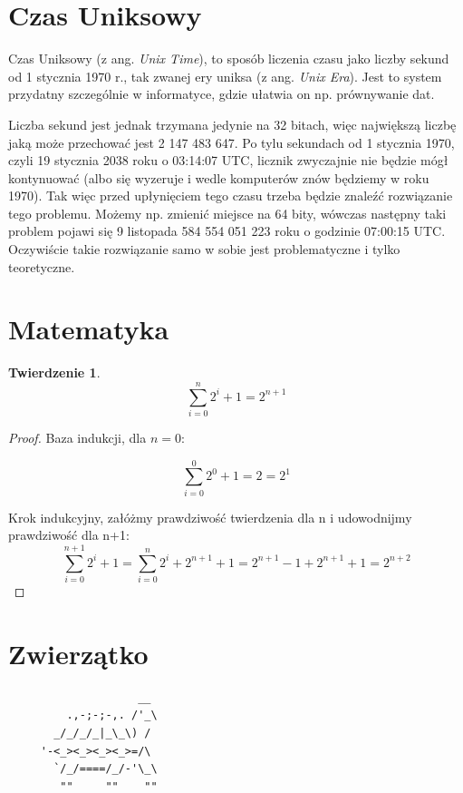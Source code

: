 \documentclass{article}
\newtheorem{twierdzenie}{Twierdzenie}
\begin{document}
\section{Czas Uniksowy}
Czas Uniksowy (z ang. \emph{Unix Time}), to sposób liczenia czasu jako liczby sekund od 1 stycznia 1970 r., tak 
zwanej ery uniksa (z ang. \emph{Unix Era}). Jest to system przydatny szczególnie w informatyce, gdzie ułatwia on np. 
prównywanie dat. 

Liczba sekund jest jednak trzymana jedynie na 32 bitach, 
więc największą liczbę jaką może przechować jest 2 147 483 647. Po tylu sekundach od 1 stycznia 1970, czyli 19 stycznia 2038 roku o 03:14:07 UTC, licznik zwyczajnie nie będzie mógł
kontynuować (albo się wyzeruje i wedle komputerów znów będziemy w roku 1970). Tak więc przed upłynięciem tego czasu
trzeba będzie znaleźć rozwiązanie tego problemu. Możemy np. 
zmienić miejsce na 64 bity, wówczas następny taki problem 
pojawi się 9 listopada 584 554 051 223 roku o godzinie 07:00:15 UTC. Oczywiście takie rozwiązanie samo w sobie jest 
problematyczne i tylko teoretyczne.

\section{Matematyka}
\begin{twierdzenie}
    \[\sum_{i=0}^{n}2^i+1=2^{n+1} \]
\end{twierdzenie}
\begin{proof}
    Baza indukcji, dla \(n=0\):

    \[
    \sum_{i=0}^{0}2^0+1 = 2 = 2^1
    \]

    Krok indukcyjny, załóżmy prawdziwość twierdzenia dla n
    i udowodnijmy prawdziwość dla n+1:
    \[
    \sum_{i=0}^{n+1}2^i+1=\sum_{i=0}^{n}2^i+2^{n+1}+1=
    2^{n+1}-1+2^{n+1}+1=2^{n+2}
    \]

\end{proof}

\section{Zwierzątko}

\begin{verbatim}
                    __
         .,-;-;-,. /'_\
       _/_/_/_|_\_\) /
     '-<_><_><_><_>=/\
       `/_/====/_/-'\_\
        ""     ""    ""

\end{verbatim}
\end{document}
